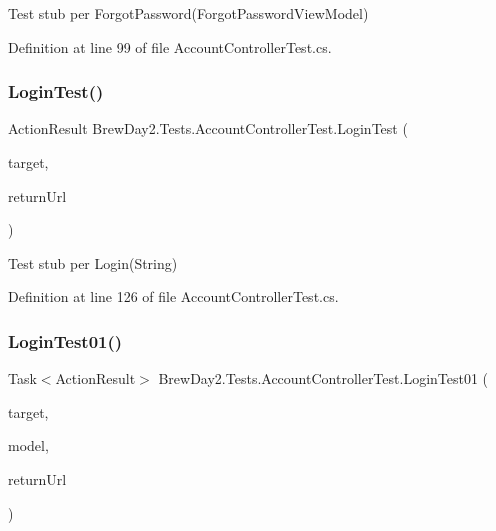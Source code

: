 Test stub per Forgot\+Password(\+Forgot\+Password\+View\+Model)



Definition at line 99 of file Account\+Controller\+Test.\+cs.

\mbox{\label{class_brew_day2_1_1_tests_1_1_account_controller_test_a9efb7c2ba333eec5dd14ca466a7a6efe}} 
\subsubsection{\texorpdfstring{Login\+Test()}{LoginTest()}}
{\footnotesize\ttfamily Action\+Result Brew\+Day2.\+Tests.\+Account\+Controller\+Test.\+Login\+Test (\begin{DoxyParamCaption}\item[{\mbox{[}\+Pex\+Assume\+Under\+Test\mbox{]} \mbox{\hyperlink{class_brew_day2_1_1_controllers_1_1_account_controller}{Account\+Controller}}}]{target,  }\item[{string}]{return\+Url }\end{DoxyParamCaption})}



Test stub per Login(\+String)



Definition at line 126 of file Account\+Controller\+Test.\+cs.

\mbox{\label{class_brew_day2_1_1_tests_1_1_account_controller_test_ac637e7e25738670cc0a15d98e293dbe9}} 
\subsubsection{\texorpdfstring{Login\+Test01()}{LoginTest01()}}
{\footnotesize\ttfamily Task$<$Action\+Result$>$ Brew\+Day2.\+Tests.\+Account\+Controller\+Test.\+Login\+Test01 (\begin{DoxyParamCaption}\item[{\mbox{[}\+Pex\+Assume\+Under\+Test\mbox{]} \mbox{\hyperlink{class_brew_day2_1_1_controllers_1_1_account_controller}{Account\+Controller}}}]{target,  }\item[{\mbox{\hyperlink{class_brew_day2_1_1_models_1_1_login_view_model}{Login\+View\+Model}}}]{model,  }\item[{string}]{return\+Url }\end{DoxyParamCaption})}



